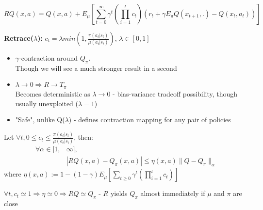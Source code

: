 \documentclass{beamer}
\begin{document}
\begin{frame}[t]

\begin{equation*}
R Q (x,a) = Q(x,a) + E_\mu \left[ \sum_{t=0}^\infty \gamma^t \left( \prod_{i=1}^{t} c_t \right) \left( r_t + \gamma E_\pi Q (x_{t+1},.) - Q(x_t,a_t) \right) \right]
\end{equation*}

\textbf{Retrace($\lambda$):} $c_t = \lambda min \left(1, \frac{\pi(a_t | s_t) }{\mu(a_t | s_t)} \right)$, $\lambda \in [0,1]$\\

\begin{itemize}
\item $\gamma$-contraction around $Q_\pi$.\\ Though we will see a much stronger result in a second\\

\item $\lambda \rightarrow 0 \Rightarrow R \rightarrow T_\pi$\\
Becomes deterministic as $\lambda \rightarrow 0$ - bias-variance tradeoff possibility, though usually unexploited ($\lambda = 1$)

\item "Safe", unlike Q($\lambda$) - defines contraction mapping for any pair of policies
\end{itemize}

\end{frame}

\begin{frame}
\begin{theorem}
Let $\forall t, 0  \leq c_t \leq \frac{\pi(a_t|s_t) }{\mu(a_t | s_t)}$, then:
\begin{align*}
 \forall \alpha \in  [1, & \infty],\\
& |RQ(x,a) - Q_\pi(x,a)| \leq \eta(x,a) \parallel Q - Q_\pi  \parallel_\alpha
\end{align*}
where $\eta(x,a) := 1 - (1-\gamma) E_\mu \left[ \sum_{t \geq 0} \gamma^t \left( \prod_{i=1}^t c_t \right) \right]$
\end{theorem}

 $\forall t, c_t \simeq 1 \Rightarrow \eta \simeq 0 \Rightarrow R Q \simeq Q_\pi$ - $R$ yields $Q_\pi$ almost immediately if $\mu$ and $\pi$ are close\\
 
\vspace{3mm}
 
\end{frame}
\end{document}
